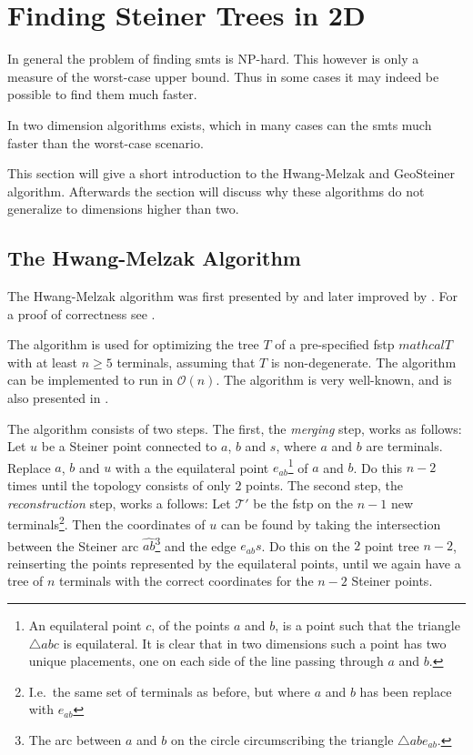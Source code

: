 \section{Finding Steiner Trees in 2D}
\label{sec:find-stein-trees-2}

In general the problem of finding \acp{smt} is NP-hard. This however is only
a measure of the worst-case upper bound. Thus in some cases it may indeed
be possible to find them much faster.

In two dimension algorithms exists, which in many cases can the \acp{smt} much
faster than the worst-case scenario.

This section will give a short introduction to the Hwang-Melzak and GeoSteiner
algorithm. Afterwards the section will discuss why these algorithms do not
generalize to dimensions higher than two.

\subsection{The Hwang-Melzak Algorithm}
\label{sec:hwang-melz-algor}

The Hwang-Melzak algorithm was first presented by \textcite{melzak1961} and later
improved by \textcite{hwang1986hexagonal}. For a proof of correctness see
\textcite{hwang1986linear, melzak1961}.

The algorithm is used for optimizing the tree $T$ of a pre-specified \ac{fstp}
$mathcal{T}$ with at least $n \ge 5$ terminals, assuming that $T$ is
non-degenerate. The algorithm can be implemented to run in $\mathcal{O}(n)$. The
algorithm is very well-known, and is also presented in
\textcite{brazil2015,smith1992}.

The algorithm consists of two steps. The first, the \textit{merging} step, works
as follows: Let $u$ be a Steiner point connected to $a$, $b$ and $s$, where $a$
and $b$ are terminals. Replace $a$, $b$ and $u$ with a the equilateral point
$e_{ab}$\footnote{An equilateral point $c$, of the points $a$ and $b$, is a
  point such that the triangle $\triangle a b c$ is equilateral. It is clear
  that in two dimensions such a point has two unique placements, one on each
  side of the line passing through $a$ and $b$.} of $a$ and $b$. Do this $n-2$
times until the topology consists of only $2$ points. The second step, the
\textit{reconstruction} step, works a follows: Let $\mathcal{T}'$ be the
\ac{fstp} on the $n-1$ new terminals\footnote{I.e.\ the same set of terminals as
before, but where $a$ and $b$ has been replace with $e_{ab}$}. Then the
coordinates of $u$ can be found by taking the intersection between the Steiner
arc $\hat{ab}$\footnote{The arc between $a$ and $b$ on the circle
  circumscribing the triangle $\triangle a b e_{ab}$.} and the edge
$e_{ab}s$. Do this on the $2$ point tree $n-2$, reinserting the points
represented by the equilateral points, until we again have a tree of $n$
terminals with the correct coordinates for the $n-2$ Steiner points.

